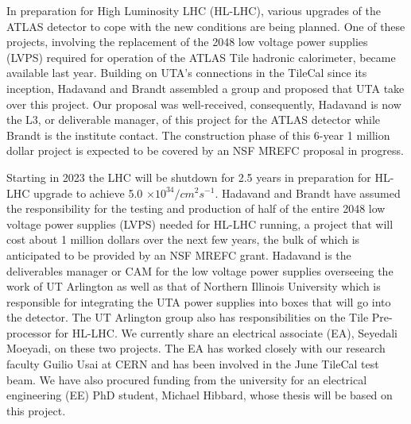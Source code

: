In preparation for High Luminosity LHC (HL-LHC), various upgrades of the ATLAS detector to cope with the new conditions are being planned. One of these projects, involving the replacement of the 2048 low voltage power supplies (LVPS) 
required for operation of the ATLAS Tile hadronic calorimeter, became available last year.  
Building on UTA's connections in the TileCal since its inception, Hadavand and Brandt assembled a group and proposed that UTA take over this project. 
Our proposal was well-received, consequently, Hadavand is now the L3, or deliverable manager, of this project for the ATLAS detector while Brandt is the institute contact. The construction phase of this 6-year 
1 million dollar project is expected to be covered by an NSF MREFC proposal in progress. 

Starting in 2023 the LHC will be shutdown for 2.5 years in preparation for HL-LHC upgrade to achieve 5.0 $\times 10^{34}/cm^2s^{-1}$. 
Hadavand and Brandt have assumed the responsibility for the testing and production of half of the entire 2048 low voltage power supplies (LVPS) needed for HL-LHC running, 
a project that will cost about 1 million dollars over the next few years, the bulk of which is anticipated to be provided by an NSF MREFC grant. 
Hadavand is the deliverables manager or CAM for the low voltage 
power supplies overseeing the work of UT Arlington as well as that of Northern Illinois University which is responsible for integrating the UTA power supplies into boxes that will go into the detector.
The UT Arlington group also has responsibilities on the Tile Pre-processor for HL-LHC.  We currently
share an electrical associate (EA), Seyedali Moeyadi, on these two projects.  The EA has worked closely with our research faculty Guilio Usai at CERN and has been involved in the June TileCal test beam.  We have also procured
funding from the university for an electrical engineering (EE) PhD student, Michael Hibbard, whose thesis will be based on this project.  

